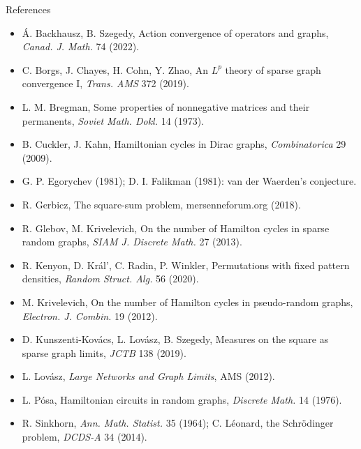 \documentclass[11pt,aspectratio=169]{beamer}
\begin{document}
\begin{frame}[allowframebreaks]{References}
\footnotesize
\begin{itemize}
\item Á. Backhausz, B. Szegedy, Action convergence of operators and graphs, \emph{Canad. J. Math.} 74 (2022).
\item C. Borgs, J. Chayes, H. Cohn, Y. Zhao, An $L^p$ theory of sparse graph convergence I, \emph{Trans. AMS} 372 (2019).
\item L. M. Bregman, Some properties of nonnegative matrices and their permanents, \emph{Soviet Math. Dokl.} 14 (1973).
\item B. Cuckler, J. Kahn, Hamiltonian cycles in Dirac graphs, \emph{Combinatorica} 29 (2009).
\item G. P. Egorychev (1981); D. I. Falikman (1981): van der Waerden's conjecture.
\item R. Gerbicz, The square-sum problem, mersenneforum.org (2018).
\item R. Glebov, M. Krivelevich, On the number of Hamilton cycles in sparse random graphs, \emph{SIAM J. Discrete Math.} 27 (2013).
\item R. Kenyon, D. Král', C. Radin, P. Winkler, Permutations with fixed pattern densities, \emph{Random Struct. Alg.} 56 (2020).
\item M. Krivelevich, On the number of Hamilton cycles in pseudo-random graphs, \emph{Electron. J. Combin.} 19 (2012).
\item D. Kunszenti-Kovács, L. Lovász, B. Szegedy, Measures on the square as sparse graph limits, \emph{JCTB} 138 (2019).
\item L. Lovász, \emph{Large Networks and Graph Limits}, AMS (2012).
\item L. Pósa, Hamiltonian circuits in random graphs, \emph{Discrete Math.} 14 (1976).
\item R. Sinkhorn, \emph{Ann. Math. Statist.} 35 (1964); C. Léonard, the Schrödinger problem, \emph{DCDS-A} 34 (2014).
\end{itemize}
\end{frame}
\end{document}
